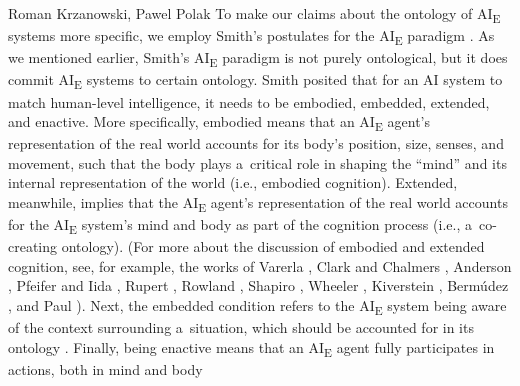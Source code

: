\begin{artengenv2auth}{Roman Krzanowski, Pawel Polak}
To make our claims about the ontology of AI\textsubscript{E} systems more specific, we employ Smith's postulates for the AI\textsubscript{E} paradigm
\parencite[][p.44]{smith_promise_2019}. %
 As we mentioned earlier, Smith's AI\textsubscript{E} paradigm is not purely ontological, but it does commit AI\textsubscript{E} systems to certain ontology. Smith posited that for an AI system to match human-level intelligence, it needs to be embodied, embedded, extended, and enactive. More specifically, embodied means that an AI\textsubscript{E} agent's representation of the real world accounts for its body's position, size, senses, and movement, such that the body plays a~critical role in shaping the ``mind'' and its internal representation of the world (i.e., embodied cognition). Extended, meanwhile, implies that the AI\textsubscript{E} agent's representation of the real world accounts for the AI\textsubscript{E} system's mind and body as part of the cognition process (i.e., a~co-creating ontology). (For more about the discussion of embodied and extended cognition, see, for example, the works of Varerla 
\parencite*[][]{varela_embodied_1991}, %
 Clark and Chalmers 
\parencite*[][]{clark_extended_1998}, %
 Anderson 
\parencite*[][]{anderson_embodied_2003}, %
 Pfeifer and Iida 
\parencite*[][]{pfeifer_embodied_2004}, %
 Rupert 
\parencite*[][]{rupert_cognitive_2009}, %
 Rowland 
\parencite*[][]{rowlands_new_2010}, %
 Shapiro 
\parencite*[][]{shapiro_embodied_2010}, %
 Wheeler 
\parencite*[][]{garvey_embodied_2011}, %
 Kiverstein 
\parencite*[][]{kiverstein_extended_2018}, %
 Bermúdez 
\parencite*[][]{hernandez-orallo_ai_2020}, %
 and Paul 
\parencite*[][]{paul_extended_2021}%
). Next, the embedded condition refers to the AI\textsubscript{E} system being aware of the context surrounding a~situation, which should be accounted for in its ontology 
\parencites[e.g.,][]{hutchins_cognition_1995}[][]{pouw_embedded_2014}. %
 Finally, being enactive means that an AI\textsubscript{E} agent fully participates in actions, both in mind and body 

\end{artengenv2auth}
